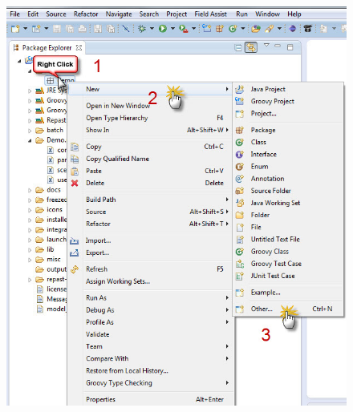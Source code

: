 \documentclass[11pt]{amsart}
\begin{document}
\begin{figure}[ht]
\begin{center}
\vspace{.2in}
\centerline {
\includegraphics[totalheight=0.4\textheight]{images/006.jpg}
}
\caption{}
\label{fig:006}
\end{center}
\end{figure}
\end{document}
